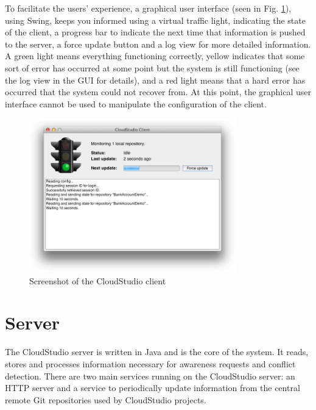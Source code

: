To facilitate the users' experience, a graphical user interface (seen in Fig. \ref{fig:gui}), using Swing, keeps you informed using a virtual traffic light, indicating the state of the client, a progress bar to indicate the next time that information is pushed to the server, a force update button and a log view for more detailed information. A green light means everything functioning correctly, yellow indicates that some sort of error has occurred at some point but the system is still functioning (see the log view in the GUI for details), and a red light means that a hard error has occurred that the system could not recover from. At this point, the graphical user interface cannot be used to manipulate the configuration of the client. \\

\begin{figure}[h!]
  \centering
      \includegraphics[width=0.8\textwidth]{gui}
  \caption{Screenshot of the CloudStudio client}
  \label{fig:gui}
\end{figure}








\section{Server}

The CloudStudio server is written in Java and is the core of the system. It reads, stores and processes information necessary for awareness requests and conflict detection. There are two main services running on the CloudStudio server: an HTTP server and a service to periodically update information from the central remote Git repositories used by CloudStudio projects. \\

